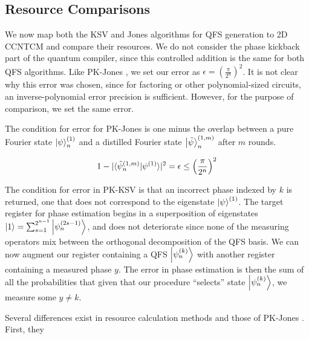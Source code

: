 \subsection{Resource Comparisons}
\label{subsec:qcompile-ksv-compare}

We now map both the KSV and Jones algorithms for QFS generation
to \textsf{2D CCNTCM} and compare their resources. We do not consider
the phase kickback part of the quantum compiler, since this controlled addition
is the same for both QFS algorithms. Like PK-Jones \cite{Jones2012}, we
set our error as $\epsilon = \left(\frac{\pi}{2^n}\right)^2$. It is not clear why
this error was chosen, since for factoring or other polynomial-sized circuits,
an inverse-polynomial error precision is sufficient. However, for the
purpose of comparison, we set the same error.

The condition for error for PK-Jones is one minus the overlap between a
pure Fourier state $\left\vert{\psi}\right\rangle^{(1)}_n$ and a distilled
Fourier state $\left\vert{\tilde{\psi}}\right\rangle^{(1,m)}_n$ after $m$ rounds.

\begin{equation}
1 - | \langle \tilde{\psi}^{(1,m)}_n|\psi^{(1)} \rangle |^2 = \epsilon \le \left( \frac{\pi}{2^n} \right)^2 
\end{equation}

The condition for error in PK-KSV is that an incorrect phase indexed by $k$ is returned,
one that does not correspond to the eigenstate $\left\vert{\psi}\right\rangle^{(1)}$. The target
register for phase estimation begins in a superposition of eigenstates
$\left\vert{1}\right\rangle = \sum_{s = 1}^{2^{n-1}} \left\vert{\psi^{(2s-1)}_n}\right\rangle$, and does not deteriorate
since none of the measuring operators mix between the orthogonal decomposition of the
QFS basis. We can now augment our register containing a QFS
$\left\vert{\psi^{(k)}_n}\right\rangle$ with another register containing a measured phase $y$.
The error in phase estimation is then the sum of all the probabilities that
given that our procedure ``selects'' state $\left\vert{\psi^{(k)}_n}\right\rangle$, we
measure some $y \ne k$.

 Several differences exist in resource
calculation methods and those of PK-Jones \cite{Jones2012}. First, they 

